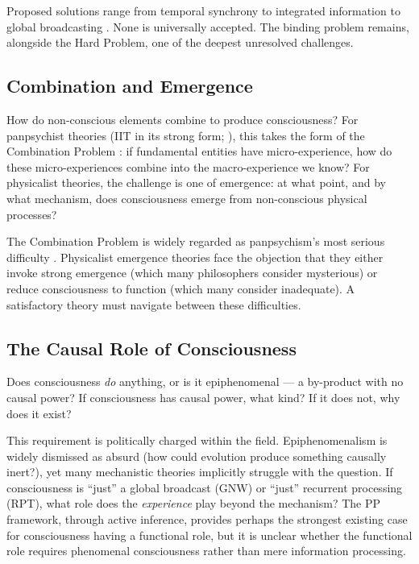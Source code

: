 \documentclass[12pt]{article}
\begin{document}
Proposed solutions range from temporal synchrony \citep{Gray1989,Singer1995,Fries2005,Fries2015} to integrated information \citep{Tononi2004} to global broadcasting \citep{Baars1988}. None is universally accepted. The binding problem remains, alongside the Hard Problem, one of the deepest unresolved challenges.


\subsection{Combination and Emergence}


How do non-conscious elements combine to produce consciousness? For panpsychist theories (IIT in its strong form; \citealp{Goff2019,Strawson2006}), this takes the form of the Combination Problem \citep{James1890,Chalmers2016}: if fundamental entities have micro-experience, how do these micro-experiences combine into the macro-experience we know? For physicalist theories, the challenge is one of emergence: at what point, and by what mechanism, does consciousness emerge from non-conscious physical processes?

The Combination Problem is widely regarded as panpsychism's most serious difficulty \citep{Chalmers2016,Coleman2014}. Physicalist emergence theories face the objection that they either invoke strong emergence (which many philosophers consider mysterious) or reduce consciousness to function (which many consider inadequate). A satisfactory theory must navigate between these difficulties.


\subsection{The Causal Role of Consciousness}


Does consciousness \emph{do} anything, or is it epiphenomenal --- a by-product with no causal power? If consciousness has causal power, what kind? If it does not, why does it exist?

This requirement is politically charged within the field. Epiphenomenalism \citep{Huxley1874,Jackson1982} is widely dismissed as absurd (how could evolution produce something causally inert?), yet many mechanistic theories implicitly struggle with the question. If consciousness is ``just'' a global broadcast (GNW) or ``just'' recurrent processing (RPT), what role does the \emph{experience} play beyond the mechanism? The PP framework, through active inference, provides perhaps the strongest existing case for consciousness having a functional role, but it is unclear whether the functional role requires phenomenal consciousness rather than mere information processing.
\end{document}
